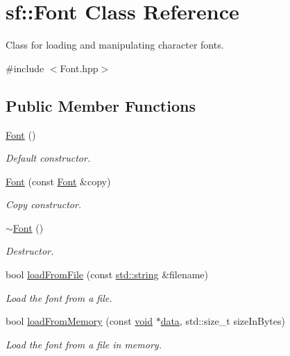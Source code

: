 \hypertarget{classsf_1_1_font}{\section{sf\-:\-:Font Class Reference}
\label{classsf_1_1_font}
}


Class for loading and manipulating character fonts.  




{\ttfamily \#include $<$Font.\-hpp$>$}

\subsection*{Public Member Functions}
\begin{DoxyCompactItemize}
\item 
\hyperlink{classsf_1_1_font_a506404655b8869ed60d1e7709812f583}{Font} ()
\begin{DoxyCompactList}\small\item\em Default constructor. \end{DoxyCompactList}\item 
\hyperlink{classsf_1_1_font_a72d7322b355ee2f1be4500f530e98081}{Font} (const \hyperlink{classsf_1_1_font}{Font} \&copy)
\begin{DoxyCompactList}\small\item\em Copy constructor. \end{DoxyCompactList}\item 
\hyperlink{classsf_1_1_font_aa18a3c62e6e01e9a21c531b5cad4b7f2}{$\sim$\-Font} ()
\begin{DoxyCompactList}\small\item\em Destructor. \end{DoxyCompactList}\item 
bool \hyperlink{classsf_1_1_font_ab020052ef4e01f6c749a85571c0f3fd1}{load\-From\-File} (const \hyperlink{gl3_8h_ac83513893df92266f79a515488701770}{std\-::string} \&filename)
\begin{DoxyCompactList}\small\item\em Load the font from a file. \end{DoxyCompactList}\item 
bool \hyperlink{classsf_1_1_font_abf2f8d6de31eb4e1db02e061c323e346}{load\-From\-Memory} (const \hyperlink{glutf90_8h_ac778d6f63f1aaf8ebda0ce6ac821b56e}{void} $\ast$\hyperlink{gl3_8h_a0f78eecb0891cce3bdfc815b971866a1}{data}, std\-::size\-\_\-t size\-In\-Bytes)
\begin{DoxyCompactList}\small\item\em Load the font from a file in memory. \end{DoxyCompactList}\item 

\end{DoxyCompactItemize}
